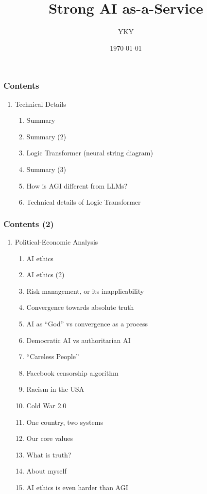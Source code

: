 \documentclass[16pt]{beamer}
\title[AGI-aaS]{Strong AI as-a-Service}
\author{YKY}
\date{\today} %
\begin{document}
\addtocounter{page}{-1}
\begin{frame}
\titlepage
\end{frame}

\addtocounter{page}{-1}
\begin{frame}[noframenumbering]
\frametitle{Contents}
\begin{enumerate}[I]
	\item Technical Details
		\begin{enumerate}[1]
			\item Summary
			\item Summary (2)
			\item Logic Transformer (neural string diagram)
			\item Summary (3)
			\item How is AGI different from LLMs?
			\item Technical details of Logic Transformer
		\end{enumerate}
\end{enumerate}
\end{frame}

\begin{frame}[noframenumbering]
\frametitle{Contents (2)}
\begin{enumerate}[I]
	\item[II] Political-Economic Analysis
	\begin{enumerate}[1]
		\item AI ethics
		\item AI ethics (2)
		\item Risk management, or its inapplicability
		\item Convergence towards absolute truth
		\item AI as ``God'' vs convergence as a process
		\item Democratic AI vs authoritarian AI
		\item ``Careless People''
		\item Facebook censorship algorithm
		\item Racism in the USA
		\item Cold War 2.0
		\item One country, two systems
		\item Our core values
		\item What is truth?
		\item About myself
		\item AI ethics is even harder than AGI
	\end{enumerate}
\end{enumerate}
\end{frame}
\end{document}
